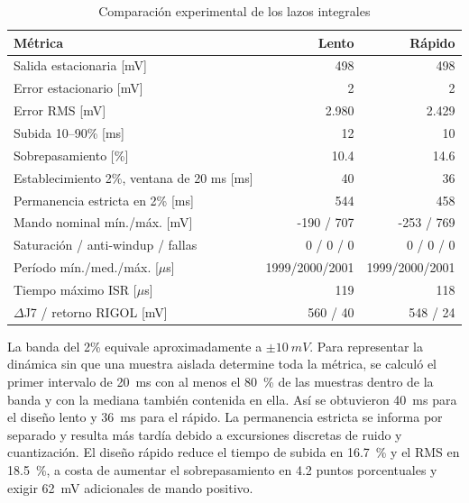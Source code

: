 \documentclass[conference]{IEEEtran}
\begin{document}
\begin{table}[!t]
\caption{Comparación experimental de los lazos integrales}
\label{tab:comparacion-integral}
\centering
\scriptsize
\begin{tabular}{p{4.2cm}rr}
\toprule
Métrica & Lento & Rápido\\
\midrule
Salida estacionaria [mV] & 498 & 498\\
Error estacionario [mV] & 2 & 2\\
Error RMS [mV] & 2.980 & 2.429\\
Subida 10--90\% [ms] & 12 & 10\\
Sobrepasamiento [\%] & 10.4 & 14.6\\
Establecimiento 2\%, ventana de 20 ms [ms] & 40 & 36\\
Permanencia estricta en 2\% [ms] & 544 & 458\\
Mando nominal mín./máx. [mV] & -190 / 707 & -253 / 769\\
Saturación / anti-windup / fallas & 0 / 0 / 0 & 0 / 0 / 0\\
Período mín./med./máx. [$\mu$s] & 1999/2000/2001 & 1999/2000/2001\\
Tiempo máximo ISR [$\mu$s] & 119 & 118\\
$\Delta$J7 / retorno RIGOL [mV] & 560 / 40 & 548 / 24\\
\bottomrule
\end{tabular}
\end{table}

La banda del 2\% equivale aproximadamente a $\pm\SI{10}{mV}$. Para representar la dinámica sin que una muestra aislada determine toda la métrica, se calculó el primer intervalo de \SI{20}{ms} con al menos el \SI{80}{\percent} de las muestras dentro de la banda y con la mediana también contenida en ella. Así se obtuvieron \SI{40}{ms} para el diseño lento y \SI{36}{ms} para el rápido. La permanencia estricta se informa por separado y resulta más tardía debido a excursiones discretas de ruido y cuantización. El diseño rápido reduce el tiempo de subida en \SI{16.7}{\percent} y el RMS en \SI{18.5}{\percent}, a costa de aumentar el sobrepasamiento en \num{4.2} puntos porcentuales y exigir \SI{62}{mV} adicionales de mando positivo.
\end{document}
